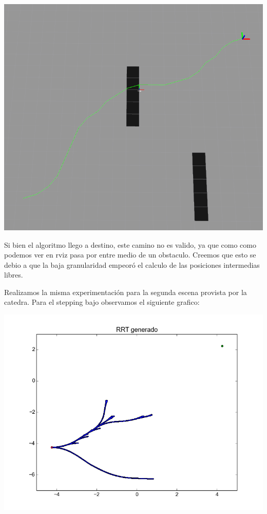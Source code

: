 \includegraphics[scale=0.5]{velocidad/stepping_alto_rviz1.png}

Si bien el algoritmo llego a destino, este camino no es valido, ya que como como podemos ver en rviz pasa por entre medio de un obstaculo. Creemos que esto se debio a que la baja granularidad empeoró el calculo de las posiciones intermedias libres.

Realizamos la misma experimentación para la segunda escena provista por la catedra. Para el stepping bajo observamos el siguiente grafico:

\includegraphics[scale=0.5]{velocidad/stepping_bajo2.png}

